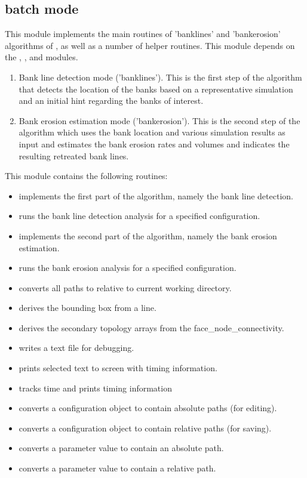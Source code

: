 \subsection{batch mode }

This module implements the main routines of 'banklines' and 'bankerosion' algorithms of \dfastbe, as well as a number of helper routines.
This module depends on the , ,  and  modules.

\begin{enumerate}
\item Bank line detection mode ('banklines').
This is the first step of the algorithm that detects the location of the banks based on a representative \dflowfm simulation and an initial hint regarding the banks of interest.
\item Bank erosion estimation mode ('bankerosion').
This is the second step of the algorithm which uses the bank location and various \dflowfm simulation results as input and estimates the bank erosion rates and volumes and indicates the resulting retreated bank lines.
\end{enumerate}

This module contains the following routines:

\begin{itemize}
\item {} implements the first part of the algorithm, namely the bank line detection.
\item {} runs the bank line detection analysis for a specified configuration.
\item {} implements the second part of the algorithm, namely the bank erosion estimation.
\item {} runs the bank erosion analysis for a specified configuration.

\item {} converts all paths to relative to current working directory.
\item {} derives the bounding box from a line.
\item {} derives the secondary topology arrays from the face\_node\_connectivity.
\item {} writes a text file for debugging.
\item {} prints selected text to screen with timing information.
\item {} tracks time and prints timing information
\item {} converts a configuration object to contain absolute paths (for editing).
\item {} converts a configuration object to contain relative paths (for saving).
\item {} converts a parameter value to contain an absolute path.
\item {} converts a parameter value to contain a relative path.
\end{itemize}


